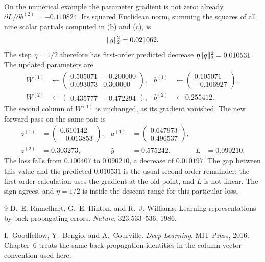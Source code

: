 On the numerical example the parameter gradient is not zero: already \(\partial L/\partial b^{(2)} = -0.110824\). Its squared Euclidean norm, summing the squares of all nine scalar partials computed in (b) and (c), is
\[
  \lVert g\rVert_2^2 = 0.021062.
\]
The step \(\eta = 1/2\) therefore has first-order predicted decrease \(\eta\lVert g\rVert_2^2 = 0.010531\). The updated parameters are
\begin{align*}
  W^{(1)} &\leftarrow
  \begin{pmatrix}
    0.505071 & -0.200000 \\
    0.093073 & 0.300000
  \end{pmatrix},
  &
  b^{(1)} &\leftarrow
  \begin{pmatrix} 0.105071 \\ -0.106927 \end{pmatrix},
  \\[0.35em]
  W^{(2)} &\leftarrow
  \begin{pmatrix} 0.435777 & -0.472294 \end{pmatrix},
  &
  b^{(2)} &\leftarrow 0.255412.
\end{align*}
The second column of \(W^{(1)}\) is unchanged, as its gradient vanished. The new forward pass on the same pair is
\begin{align*}
  z^{(1)} &= \begin{pmatrix} 0.610142 \\ -0.013853 \end{pmatrix},
  &
  a^{(1)} &= \begin{pmatrix} 0.647973 \\ 0.496537 \end{pmatrix},
  \\
  z^{(2)} &= 0.303273,
  &
  \hat y &= 0.575242,
  &
  L &= 0.090210.
\end{align*}
The loss falls from \(0.100407\) to \(0.090210\), a decrease of \(0.010197\). The gap between this value and the predicted \(0.010531\) is the usual second-order remainder: the first-order calculation uses the gradient at the old point, and \(L\) is not linear. The sign agrees, and \(\eta = 1/2\) is inside the descent range for this particular loss.

\begin{thebibliography}{9}
D.~E. Rumelhart, G.~E. Hinton, and R.~J. Williams.
\newblock Learning representations by back-propagating errors.
\newblock \emph{Nature}, 323:533--536, 1986.

I.~Goodfellow, Y.~Bengio, and A.~Courville.
\newblock \emph{Deep Learning}. MIT Press, 2016.
\newblock Chapter~6 treats the same back-propagation identities in the column-vector convention used here.
\end{thebibliography}


